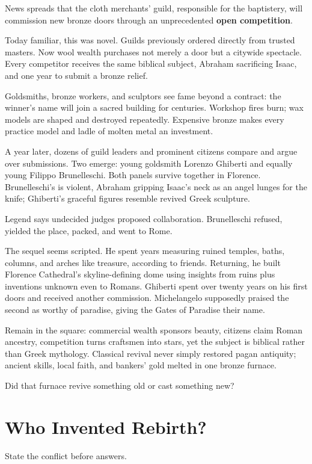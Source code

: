 News spreads that the cloth merchants' guild, responsible for the baptistery, will commission new bronze doors through an unprecedented \textbf{open competition}.

Today familiar, this was novel. Guilds previously ordered directly from trusted masters. Now wool wealth purchases not merely a door but a citywide spectacle. Every competitor receives the same biblical subject, Abraham sacrificing Isaac, and one year to submit a bronze relief.

Goldsmiths, bronze workers, and sculptors see fame beyond a contract: the winner's name will join a sacred building for centuries. Workshop fires burn; wax models are shaped and destroyed repeatedly. Expensive bronze makes every practice model and ladle of molten metal an investment.

A year later, dozens of guild leaders and prominent citizens compare and argue over submissions. Two emerge: young goldsmith Lorenzo Ghiberti and equally young Filippo Brunelleschi. Both panels survive together in Florence. Brunelleschi's is violent, Abraham gripping Isaac's neck as an angel lunges for the knife; Ghiberti's graceful figures resemble revived Greek sculpture.

Legend says undecided judges proposed collaboration. Brunelleschi refused, yielded the place, packed, and went to Rome.

The sequel seems scripted. He spent years measuring ruined temples, baths, columns, and arches like treasure, according to friends. Returning, he built Florence Cathedral's skyline-defining dome using insights from ruins plus inventions unknown even to Romans. Ghiberti spent over twenty years on his first doors and received another commission. Michelangelo supposedly praised the second as worthy of paradise, giving the Gates of Paradise their name.

Remain in the square: commercial wealth sponsors beauty, citizens claim Roman ancestry, competition turns craftsmen into stars, yet the subject is biblical rather than Greek mythology. Classical revival never simply restored pagan antiquity; ancient skills, local faith, and bankers' gold melted in one bronze furnace.

Did that furnace revive something old or cast something new?

\section{Who Invented Rebirth?}
State the conflict before answers.

